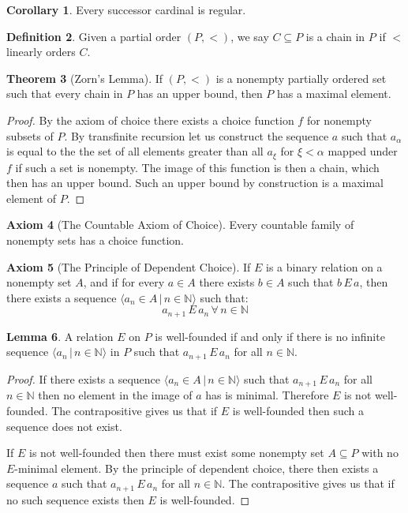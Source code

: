 \documentclass{article}
\theoremstyle{definition}
\newtheorem{thm}{Theorem}[section]
\newtheorem{crly}[thm]{Corollary}
\newtheorem{defn}[thm]{Definition}
\newtheorem{axm}[thm]{Axiom}
\newtheorem{lmma}[thm]{Lemma}
\newcommand{\N}{\mathbb{N}}
\begin{document}
\begin{crly}
    Every successor cardinal is regular.
\end{crly}

\begin{defn}
    Given a partial order $(P,<)$, we say $C \subseteq P$ is a chain in $P$ if $<$ linearly orders $C$.
\end{defn}

\begin{thm}[Zorn's Lemma]
    If $(P, <)$ is a nonempty partially ordered set such that every chain in $P$ has an upper bound, then $P$ has a maximal element.
\end{thm}

\begin{proof}
    By the axiom of choice there exists a choice function $f$ for nonempty subsets of $P$. By transfinite recursion let us construct the sequence $a$ such that $a_\alpha$ is equal to the the set of all elements greater than all $a_\xi$ for $\xi < \alpha$ mapped under $f$ if such a set is nonempty. The image of this function is then a chain, which then has an upper bound. Such an upper bound by construction is a maximal element of $P$.
\end{proof}

\begin{axm}[The Countable Axiom of Choice]
    Every countable family of nonempty sets has a choice function.
\end{axm}

\begin{axm}[The Principle of Dependent Choice]
    If $E$ is a binary relation on a nonempty set $A$, and if for every $a \in A$ there exists $b \in A$ such that $b \, E \, a$, then there exists a sequence $\langle a_n \in A \, | \, n \in \N \rangle$ such that:
    \[
        a_{n + 1} \, E \, a_n \, \forall \, n \in \N    
    \]
\end{axm}

\begin{lmma}
    A relation $E$ on $P$ is well-founded if and only if there is no infinite sequence $\langle a_n \, | \, n \in \N \rangle$ in $P$ such that $a_{n + 1} \, E \, a_n$ for all $n \in \N$.
\end{lmma}

\begin{proof}
    If there exists a sequence $\langle a_n \in A \, | \, n \in \N\rangle$ such that $a_{n + 1} \, E \, a_n$ for all $n \in \N$ then no element in the image of $a$ has is minimal. Therefore $E$ is not well-founded. The contrapositive gives us that if $E$ is well-founded then such a sequence does not exist.

    If $E$ is not well-founded then there must exist some nonempty set $A \subseteq P$ with no $E$-minimal element. By the principle of dependent choice, there then exists a sequence $a$ such that $a_{n + 1} \, E \, a_n$ for all $n \in \N$. The contrapositive gives us that if no such sequence exists then $E$ is well-founded.
\end{proof}
\end{document}
